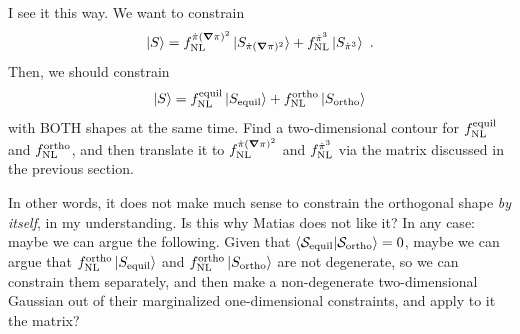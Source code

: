 \documentclass[aps,prd,amsmath,floats,floatfix,superscriptaddress,nofootinbib%
]{revtex4}%
\renewcommand\({\left(}
\renewcommand\){\right)}
\renewcommand\[{\left[}
\renewcommand\]{\right]}
\renewcommand{\vec}{\bm}
\begin{document}
\noindent I see it this way. We want to constrain 
\begin{equation}
\ket{S} = f_{\rm NL}^{\dot{\pi}(\vec{\nabla}\pi)^2}\ket{S_{\dot{\pi}(\vec{\nabla}\pi)^2}} + f_{\rm NL}^{\dot{\pi}^3}\ket{S_{\dot{\pi}^3}}\,\,. 
\end{equation} 
Then, we should constrain 
\begin{equation}
\ket{S} = f_{\rm NL}^{\rm equil}\ket{S_{\rm equil}} + f_{\rm NL}^{\rm ortho}\ket{S_{\rm ortho}}%
\end{equation} 
with BOTH shapes at the same time. Find a two-dimensional contour for $f_{\rm NL}^{\rm equil}$ and $f_{\rm NL}^{\rm ortho}$, and then translate it 
to $f_{\rm NL}^{\dot{\pi}(\vec{\nabla}\pi)^2}$ and $f_{\rm NL}^{\dot{\pi}^3}$ via the matrix discussed in the previous section. 

In other words, it does not make much sense to constrain the orthogonal shape \emph{by itself}, in my understanding. Is this why Matias does not like it? 
In any case: maybe we can argue the following. Given that $\braket{{\cal S}_{\rm equil}|{\cal S}_{\rm ortho}}=0$, maybe we can argue that $f_{\rm NL}^{\rm ortho}\ket{S_{\rm equil}}$ and $f_{\rm NL}^{\rm ortho}\ket{S_{\rm ortho}}$ are not degenerate, so we can constrain them separately, and then make a non-degenerate two-dimensional Gaussian out of their marginalized one-dimensional constraints, and apply to it the matrix? 
\end{document}
